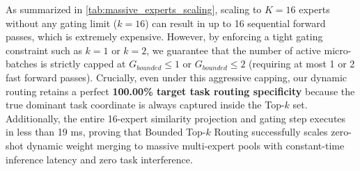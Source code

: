 \begin{itemize}
\begin{table}[h]
\caption{Gating projection latency (ms), active micro-batches bound $G_{bounded}$, and target task routing specificity (\%) under a massive pool of $K=16$ experts ($B=256$, $d=4,096$). For low $k$, Bounded Top-$k$ Routing enforces a tight inference cost ceiling while maintaining 100\% routing specificity.}
\label{tab:massive_experts_scaling}
\vskip 0.1in
\begin{center}
\begin{small}
\end{small}
\end{center}
\vskip -0.1in
\end{table}

As summarized in \cref{tab:massive_experts_scaling}, scaling to $K=16$ experts without any gating limit ($k=16$) can result in up to 16 sequential forward passes, which is extremely expensive. However, by enforcing a tight gating constraint such as $k=1$ or $k=2$, we guarantee that the number of active micro-batches is strictly capped at $G_{bounded} \le 1$ or $G_{bounded} \le 2$ (requiring at most 1 or 2 fast forward passes). Crucially, even under this aggressive capping, our dynamic routing retains a perfect \textbf{100.00\% target task routing specificity} because the true dominant task coordinate is always captured inside the Top-$k$ set. Additionally, the entire 16-expert similarity projection and gating step executes in less than 19 ms, proving that Bounded Top-$k$ Routing successfully scales zero-shot dynamic weight merging to massive multi-expert pools with constant-time inference latency and zero task interference.


\end{itemize}
